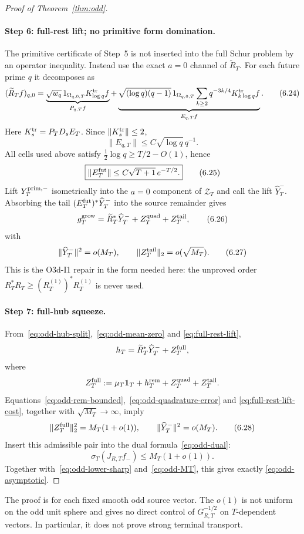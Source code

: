 \begin{proof}[Proof of Theorem~\ref{thm:odd}]
\paragraph{Step 6: full-rest lift; no primitive form domination.}
The primitive certificate of Step~5 is not inserted into the full Schur problem by an
operator inequality.  Instead use the exact $a=0$ channel of $\widetilde R_T$.
For each future prime $q$ it decomposes as
\[
 (\widetilde R_Tf)_{q,0}
 =\underbrace{\sqrt{w_q}\,1_{\Omega_{q,0,T}}
 K_{\log q}^{\rm tr}f}_{P_{q,T}f}
 +\underbrace{\sqrt{(\log q)(q-1)}\,1_{\Omega_{q,0,T}}
 \sum_{k\ge2}q^{-3k/4}K_{k\log q}^{\rm tr}f}_{E_{q,T}f}.
\tag{6.24}\label{eq:future-primitive-tail}
\]
Here $K_s^{\rm tr}=P_TD_sE_T$.  Since $\|K_s^{\rm tr}\|\le2$,
\[
 \|E_{q,T}\|\le C\sqrt{\log q}\,q^{-1}.
\]
All cells used above satisfy
$\frac12\log q\ge T/2-O(1)$, hence
\[
 \boxed{
 \|E_T^{\rm fut}\|
 \le C\sqrt{T+1}\,e^{-T/2}.
 }
\tag{6.25}\label{eq:future-tail-small}
\]
Lift $Y_T^{\rm prim,-}$ isometrically into the $a=0$ component of $\mathscr Z_T$ and
call the lift $\widehat Y_T^-$.  Absorbing the tail
$(E_T^{\rm fut})^*\widehat Y_T^-$ into the source remainder gives
\[
 g_T^{\rm grow}
 =\widetilde R_T^*\widehat Y_T^-
 +Z_T^{\rm quad}+Z_T^{\rm tail},
\tag{6.26}\label{eq:full-rest-lift}
\]
with
\[
 \|\widehat Y_T^-\|^2=o(M_T),
 \qquad
 \|Z_T^{\rm tail}\|_2=o(\sqrt{M_T}).
\tag{6.27}\label{eq:full-rest-lift-cost}
\]
This is the O3d-I1 repair in the form needed here: the unproved order
$R_T^*R_T\ge(R_T^{(1)})^*R_T^{(1)}$ is never used.

\paragraph{Step 7: full-hub squeeze.}
From~\eqref{eq:odd-hub-split},~\eqref{eq:odd-mean-zero} and
\eqref{eq:full-rest-lift},
\[
 h_T=\widetilde R_T^*\widehat Y_T^-+Z_T^{\rm full},
\]
where
\[
 Z_T^{\rm full}
 :=\mu_T\mathbf1_T+h_T^{\rm rem}+Z_T^{\rm quad}+Z_T^{\rm tail}.
\]
Equations~\eqref{eq:odd-rem-bounded},~\eqref{eq:odd-quadrature-error} and
\eqref{eq:full-rest-lift-cost}, together with $\sqrt{M_T}\to\infty$, imply
\[
 \|Z_T^{\rm full}\|_2^2=M_T(1+o(1)),
 \qquad
 \|\widehat Y_T^-\|^2=o(M_T).
\tag{6.28}\label{eq:full-hub-cost}
\]
Insert this admissible pair into the dual formula~\eqref{eq:odd-dual}:
\[
 \sigma_T(J_{R,T}f_-)
 \le M_T(1+o(1)).
\tag{6.29}\label{eq:odd-upper-sharp}
\]
Together with~\eqref{eq:odd-lower-sharp} and~\eqref{eq:odd-MT}, this gives exactly
\eqref{eq:odd-asymptotic}.
\end{proof}

\begin{remark}\label{rem:odd-fixed-vector-firewall}
The proof is for each fixed smooth odd source vector.  The $o(1)$ is not uniform on the
odd unit sphere and gives no direct control of $G_{R,T}^{-1/2}$ on $T$-dependent
vectors.  In particular, it does not prove strong terminal transport.
\end{remark}
